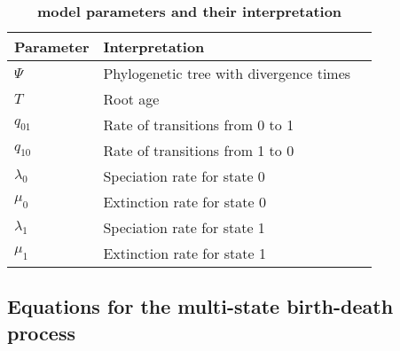 \begin{table}[h!]
	\centering
	\caption{\bf{\BiSSE model parameters and their interpretation}} \label{tab:Bparam}
	\begin{tabular}{ l l l }
		\toprule
		Parameter & Interpretation \\
		\midrule
		$\Psi$ & Phylogenetic tree with divergence times \\
		\rowcolor{gray!15} $T$ & Root age \\
		$q_{01}$ & Rate of transitions from 0 to 1 \\
		\rowcolor{gray!15} $q_{10}$ & Rate of transitions from 1 to 0 \\
		$\lambda_0$ & Speciation rate for state 0 \\
		\rowcolor{gray!15} $\mu_0$ & Extinction rate for state 0 \\
		$\lambda_1$ & Speciation rate for state 1 \\
		\rowcolor{gray!15} $\mu_1$ & Extinction rate for state 1 \\
	\end{tabular}
\end{table}

\subsection{Equations for the multi-state birth-death process}

